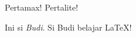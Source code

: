 \documentclass{article}
\begin{document}
Pertamax!
Pertalite!

Ini si \emph{Budi}. Si Budi belajar \LaTeX!
\end{document}
